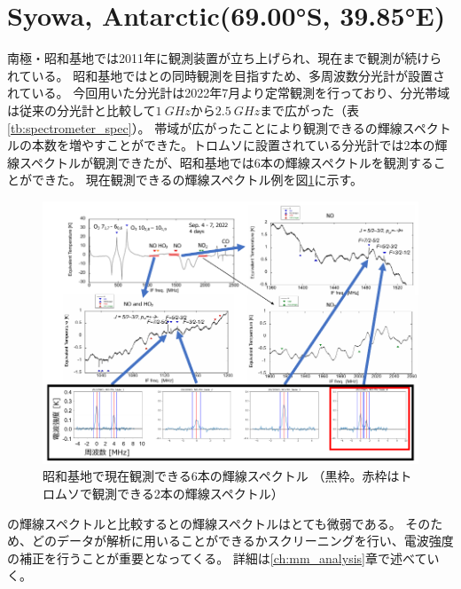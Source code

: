 \section{Syowa, Antarctic(69.00°S, 39.85°E)}
\label{sec:mm_syowa}
南極・昭和基地では2011年に観測装置が立ち上げられ、現在まで観測が続けられている。
昭和基地ではとの同時観測を目指すため、多周波数分光計が設置されている。
今回用いた分光計は2022年7月より定常観測を行っており、分光帯域は従来の分光計と比較して$1\ GHz$から$2.5\ GHz$まで広がった（表\ref{tb:spectrometer_spec}）。
帯域が広がったことにより観測できるの輝線スペクトルの本数を増やすことができた。トロムソに設置されている分光計では2本の輝線スペクトルが観測できたが、昭和基地では6本の輝線スペクトルを観測することができた。
現在観測できるの輝線スペクトル例を図\ref{fig:NO_spectr}に示す。
\begin{figure}[htbp]
    \centering
    \includegraphics[width=\linewidth]{master_thesis_contents/master_thesis_fig/NO_spectr.pdf}
    \caption{\protect 昭和基地で現在観測できる6本の輝線スペクトル \linebreak
    （黒枠。赤枠はトロムソで観測できる2本の輝線スペクトル）}
    \label{fig:NO_spectr}
\end{figure}
の輝線スペクトルと比較するとの輝線スペクトルはとても微弱である。
そのため、どのデータが解析に用いることができるかスクリーニングを行い、電波強度の補正を行うことが重要となってくる。
詳細は\ref{ch:mm_analysis}章で述べていく。
